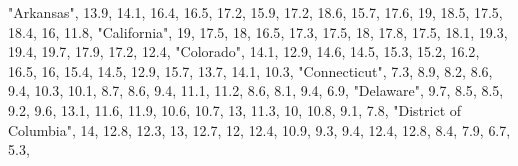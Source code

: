\documentclass[
]{book}
\newenvironment{Shaded}{\begin{snugshade}}{\end{snugshade}}
\newcommand{\DecValTok}[1]{\textcolor[rgb]{0.00,0.00,0.81}{#1}}
\newcommand{\FloatTok}[1]{\textcolor[rgb]{0.00,0.00,0.81}{#1}}
\newcommand{\NormalTok}[1]{#1}
\newcommand{\StringTok}[1]{\textcolor[rgb]{0.31,0.60,0.02}{#1}}
\begin{document}
\begin{Shaded}
\begin{Highlighting}[]
              \StringTok{"Arkansas"}\NormalTok{, }\FloatTok{13.9}\NormalTok{, }\FloatTok{14.1}\NormalTok{, }\FloatTok{16.4}\NormalTok{, }\FloatTok{16.5}\NormalTok{, }\FloatTok{17.2}\NormalTok{, }\FloatTok{15.9}\NormalTok{, }\FloatTok{17.2}\NormalTok{, }\FloatTok{18.6}\NormalTok{, }\FloatTok{15.7}\NormalTok{, }\FloatTok{17.6}\NormalTok{,   }\DecValTok{19}\NormalTok{, }\FloatTok{18.5}\NormalTok{, }\FloatTok{17.5}\NormalTok{, }\FloatTok{18.4}\NormalTok{,   }\DecValTok{16}\NormalTok{, }\FloatTok{11.8}\NormalTok{,}
            \StringTok{"California"}\NormalTok{,   }\DecValTok{19}\NormalTok{, }\FloatTok{17.5}\NormalTok{,   }\DecValTok{18}\NormalTok{, }\FloatTok{16.5}\NormalTok{, }\FloatTok{17.3}\NormalTok{, }\FloatTok{17.5}\NormalTok{,   }\DecValTok{18}\NormalTok{, }\FloatTok{17.8}\NormalTok{, }\FloatTok{17.5}\NormalTok{, }\FloatTok{18.1}\NormalTok{, }\FloatTok{19.3}\NormalTok{, }\FloatTok{19.4}\NormalTok{, }\FloatTok{19.7}\NormalTok{, }\FloatTok{17.9}\NormalTok{, }\FloatTok{17.2}\NormalTok{, }\FloatTok{12.4}\NormalTok{,}
              \StringTok{"Colorado"}\NormalTok{, }\FloatTok{14.1}\NormalTok{, }\FloatTok{12.9}\NormalTok{, }\FloatTok{14.6}\NormalTok{, }\FloatTok{14.5}\NormalTok{, }\FloatTok{15.3}\NormalTok{, }\FloatTok{15.2}\NormalTok{, }\FloatTok{16.2}\NormalTok{, }\FloatTok{16.5}\NormalTok{,   }\DecValTok{16}\NormalTok{, }\FloatTok{15.4}\NormalTok{, }\FloatTok{14.5}\NormalTok{, }\FloatTok{12.9}\NormalTok{, }\FloatTok{15.7}\NormalTok{, }\FloatTok{13.7}\NormalTok{, }\FloatTok{14.1}\NormalTok{, }\FloatTok{10.3}\NormalTok{,}
           \StringTok{"Connecticut"}\NormalTok{,  }\FloatTok{7.3}\NormalTok{,  }\FloatTok{8.9}\NormalTok{,  }\FloatTok{8.2}\NormalTok{,  }\FloatTok{8.6}\NormalTok{,  }\FloatTok{9.4}\NormalTok{, }\FloatTok{10.3}\NormalTok{, }\FloatTok{10.1}\NormalTok{,  }\FloatTok{8.7}\NormalTok{,  }\FloatTok{8.6}\NormalTok{,  }\FloatTok{9.4}\NormalTok{, }\FloatTok{11.1}\NormalTok{, }\FloatTok{11.2}\NormalTok{,  }\FloatTok{8.6}\NormalTok{,  }\FloatTok{8.1}\NormalTok{,  }\FloatTok{9.4}\NormalTok{,  }\FloatTok{6.9}\NormalTok{,}
              \StringTok{"Delaware"}\NormalTok{,  }\FloatTok{9.7}\NormalTok{,  }\FloatTok{8.5}\NormalTok{,  }\FloatTok{8.5}\NormalTok{,  }\FloatTok{9.2}\NormalTok{,  }\FloatTok{9.6}\NormalTok{, }\FloatTok{13.1}\NormalTok{, }\FloatTok{11.6}\NormalTok{, }\FloatTok{11.9}\NormalTok{, }\FloatTok{10.6}\NormalTok{, }\FloatTok{10.7}\NormalTok{,   }\DecValTok{13}\NormalTok{, }\FloatTok{11.3}\NormalTok{,   }\DecValTok{10}\NormalTok{, }\FloatTok{10.8}\NormalTok{,  }\FloatTok{9.1}\NormalTok{,  }\FloatTok{7.8}\NormalTok{,}
  \StringTok{"District of Columbia"}\NormalTok{,   }\DecValTok{14}\NormalTok{, }\FloatTok{12.8}\NormalTok{, }\FloatTok{12.3}\NormalTok{,   }\DecValTok{13}\NormalTok{, }\FloatTok{12.7}\NormalTok{,   }\DecValTok{12}\NormalTok{, }\FloatTok{12.4}\NormalTok{, }\FloatTok{10.9}\NormalTok{,  }\FloatTok{9.3}\NormalTok{,  }\FloatTok{9.4}\NormalTok{, }\FloatTok{12.4}\NormalTok{, }\FloatTok{12.8}\NormalTok{,  }\FloatTok{8.4}\NormalTok{,  }\FloatTok{7.9}\NormalTok{,  }\FloatTok{6.7}\NormalTok{,  }\FloatTok{5.3}\NormalTok{,}

\end{Highlighting}
\end{Shaded}
\end{document}
